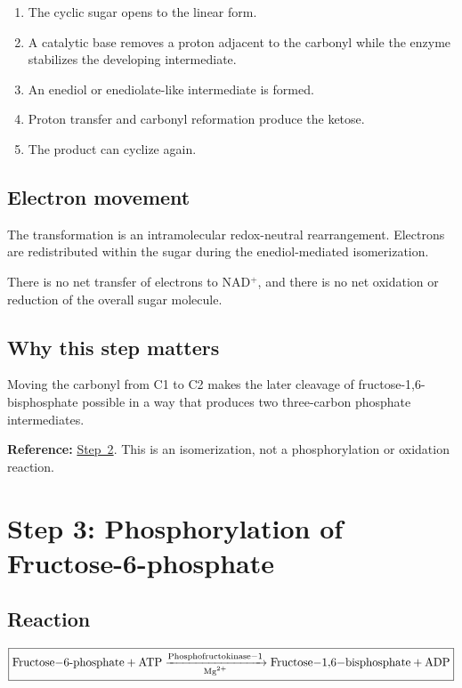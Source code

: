 \documentclass[11pt,a4paper]{article}
\newcommand{\stepref}[1]{\hyperref[step:#1]{Step~#1}}
\newcommand{\Note}[1]{\par\smallskip
  \noindent\colorbox{gray!12}{
    \parbox{0.96\linewidth}{#1}
  }\par\smallskip}
\begin{document}
\begin{enumerate}
  \item The cyclic sugar opens to the linear form.
  \item A catalytic base removes a proton adjacent to the carbonyl
  while the enzyme stabilizes the developing intermediate.
  \item An enediol or enediolate-like intermediate is formed.
  \item Proton transfer and carbonyl reformation produce the ketose.
  \item The product can cyclize again.
\end{enumerate}

\subsection{Electron movement}

The transformation is an intramolecular redox-neutral rearrangement.
Electrons are redistributed within the sugar during the enediol-mediated
isomerization.

There is no net transfer of electrons to NAD$^+$, and there is no net
oxidation or reduction of the overall sugar molecule.

\subsection{Why this step matters}

Moving the carbonyl from C1 to C2 makes the later cleavage of
fructose-1,6-bisphosphate possible in a way that produces two
three-carbon phosphate intermediates.

\Note{
\textbf{Reference:} \stepref{2}. This is an isomerization, not a
phosphorylation or oxidation reaction.
}

\section{Step 3: Phosphorylation of Fructose-6-phosphate}
\label{step:3}

\subsection{Reaction}

\[
\boxed{
\ce{
Fructose-6-phosphate + ATP
->[Phosphofructokinase-1][Mg^{2+}]
Fructose-1,6-bisphosphate + ADP
}
}
\]
\end{document}
